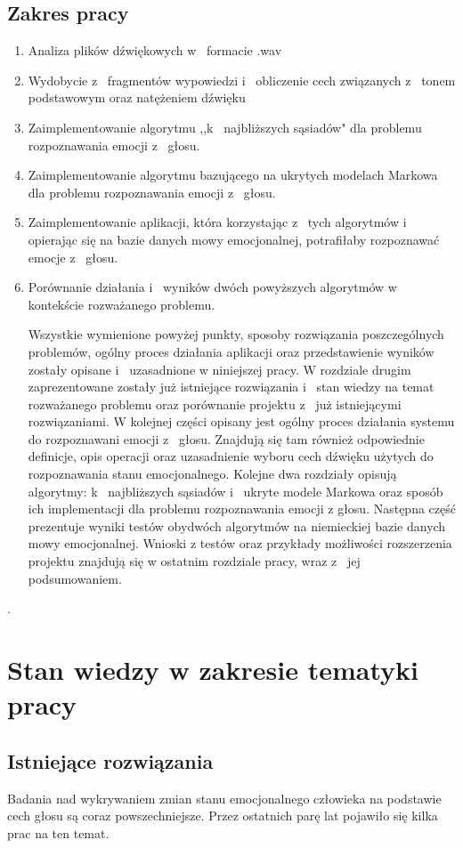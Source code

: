 \documentclass[declaration,shortabstract]{iithesis}
\begin{document}
\section{Zakres pracy}
\begin{enumerate}
\item Analiza plików dźwiękowych w~ formacie .wav
\item Wydobycie z~ fragmentów wypowiedzi i~ obliczenie cech związanych z~ tonem podstawowym oraz natężeniem dźwięku
\item Zaimplementowanie algorytmu ,,k~ najbliższych sąsiadów" dla problemu rozpoznawania emocji z~ głosu.
\item Zaimplementowanie algorytmu bazującego na ukrytych modelach Markowa dla problemu rozpoznawania emocji z~ głosu.
\item Zaimplementowanie aplikacji, która korzystając z~ tych algorytmów i~ opierając się na bazie danych mowy emocjonalnej, potrafiłaby rozpoznawać emocje z~ głosu.
\item Porównanie działania i~ wyników dwóch powyższych algorytmów w kontekście rozważanego problemu.

Wszystkie wymienione powyżej punkty, sposoby rozwiązania poszczególnych problemów, ogólny proces działania aplikacji oraz przedstawienie wyników zostały opisane i~ uzasadnione w niniejszej pracy. W rozdziale drugim zaprezentowane zostały już istniejące rozwiązania i~ stan wiedzy na temat rozważanego problemu oraz porównanie projektu z~ już istniejącymi rozwiązaniami. W kolejnej części opisany jest ogólny proces działania systemu do rozpoznawani emocji z~ głosu. Znajdują się tam również odpowiednie definicje, opis operacji oraz uzasadnienie wyboru cech dźwięku użytych do rozpoznawania stanu emocjonalnego. Kolejne dwa rozdziały opisują algorytmy: k~ najbliższych sąsiadów i~ ukryte modele Markowa oraz sposób ich implementacji dla problemu rozpoznawania emocji z głosu. Następna część prezentuje wyniki testów obydwóch algorytmów na niemieckiej bazie danych mowy emocjonalnej. Wnioski z testów oraz przykłady możliwości rozszerzenia projektu znajdują się w ostatnim rozdziale pracy, wraz z~ jej podsumowaniem.

\end{enumerate}.

\chapter{Stan wiedzy w zakresie tematyki pracy}
\section{Istniejące rozwiązania}
Badania nad wykrywaniem zmian stanu emocjonalnego człowieka na podstawie cech głosu są coraz powszechniejsze. Przez ostatnich parę lat pojawiło się kilka prac na ten temat. 
\end{document}
